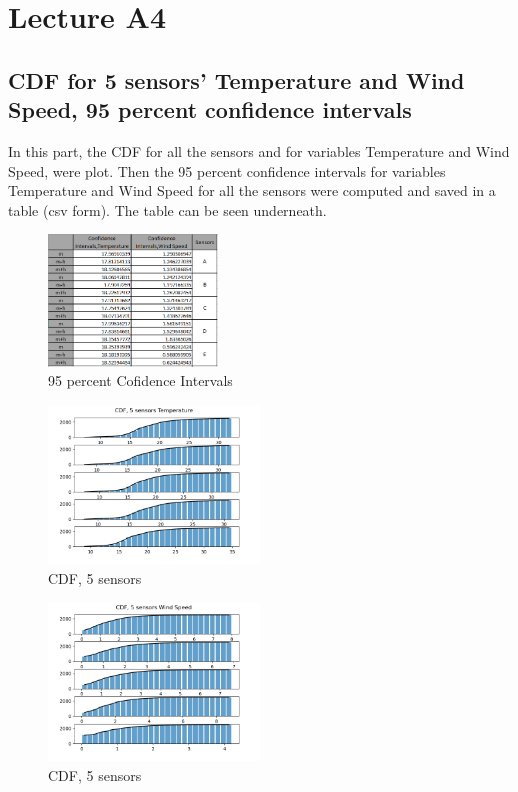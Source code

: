 \documentclass[a4paper,12pt]{article} %
\begin{document}
\section{Lecture A4}
\vspace{5mm}
\subsection{CDF for 5 sensors' Temperature and Wind Speed, 95 percent confidence intervals}
\vspace{10mm}
 In this part, the CDF for all the sensors and for variables Temperature and Wind Speed, were plot. Then the 95 percent confidence intervals for variables Temperature and Wind Speed for all the sensors were computed and saved in a table (csv form). The table can be seen underneath.
 \vspace{10mm}
\begin{figure}[H]   
	\centering 
	\includegraphics[width=0.4\textwidth]{Confidence_intervals.png}
	\caption{95 percent Cofidence Intervals } 
\end{figure}
\begin{figure}[H]   
	\centering 
	\includegraphics[width=0.5\textwidth]{Figure_9.png}
	\caption{CDF, 5 sensors } 
\end{figure}
\begin{figure}[H]   
	\centering 
	\includegraphics[width=0.5\textwidth]{Figure_18.png}
	\caption{CDF, 5 sensors } 
\end{figure}
\end{document}
